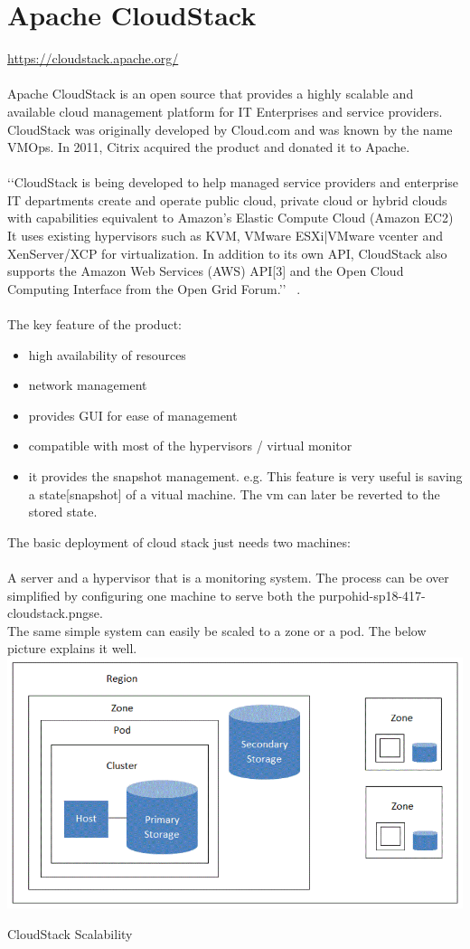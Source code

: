\graphicspath{ {images/} }
\section{Apache CloudStack}
\url{ https://cloudstack.apache.org/} \\
\\
Apache CloudStack is an open source that provides a highly scalable and available 
cloud management platform for IT
Enterprises and service providers. CloudStack was originally developed by Cloud.com and was known by the name VMOps. 
In 2011, Citrix acquired the product and donated it to Apache. \\
\\
‘‘CloudStack is being developed to help managed service providers and enterprise IT 
departments create and operate public cloud, private cloud or hybrid clouds
with capabilities equivalent to Amazon's Elastic Compute Cloud (Amazon EC2)
It uses existing hypervisors such as KVM, VMware ESXi|VMware vcenter and
XenServer/XCP for virtualization. In addition to its own API, CloudStack 
also supports the Amazon Web Services (AWS) API[3] and the Open Cloud Computing Interface from the Open Grid Forum.’’  
~\cite{ hid-sp18-417-wiki-cloudStack}. 
\\
\\
The key feature of the product:
\begin{itemize}
\item        high availability of resources
\item        network management
\item        provides GUI for ease of management
\item        compatible with most of the hypervisors / virtual monitor
\item        it provides the snapshot management. e.g. This feature is 
very useful is saving a state[snapshot] of a vitual machine. 
The vm can later be reverted to the stored state.  
\end{itemize}
 The basic deployment of cloud stack just needs two machines: \\
 \\
 A server and a hypervisor that is a monitoring system. 
 The process can be over simplified by configuring one machine 
 to serve both the purpohid-sp18-417-cloudstack.pngse. \\
 The same simple system can easily be scaled to a zone or a pod.
 The below picture explains it well.
 \includegraphics[width=\textwidth]{hid-sp18-417-cloudstack}
\begin{center}
CloudStack Scalability ~\cite{hid-sp18-417-cloudstack-scaling} 
\end{center}

